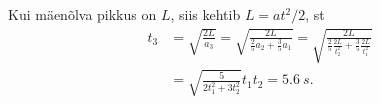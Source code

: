 Kui mäenõlva pikkus on $L$, siis kehtib $L = at^2/2$, st
\begin{align*}
t_3 &= \sqrt{\frac{2L}{a_3}} = \sqrt{\frac{2L}{\frac{2}{5}a_2 + \frac{3}{5}a_1}} = \sqrt{\frac{2L}{\frac{2}{5}\frac{2L}{t_2^2} + \frac{3}{5}\frac{2L}{t_1^2}}}\\
&= \sqrt{\frac{5}{2t_1^2+3t_2^2}}t_1t_2 = \SI{5.6}{s}.
\end{align*}
\probend
